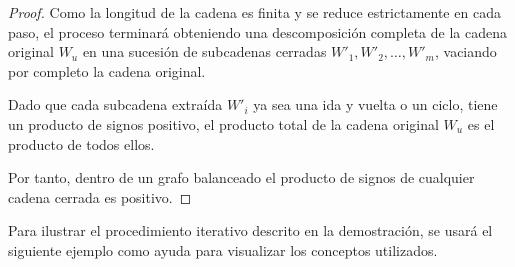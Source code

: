 \documentclass[11pt,a4paper,spanish]{report}
\theoremstyle{plain}
\begin{document}
\begin{proof}

Como la longitud de la cadena es finita y se reduce estrictamente en cada paso, el proceso terminará obteniendo una descomposición completa de la cadena original $W_u$ en una sucesión de subcadenas cerradas $W'_1, W'_2, \ldots, W'_m$, vaciando por completo la cadena original.

Dado que cada subcadena extraída $W'_i$ ya sea una ida y vuelta o un ciclo, tiene un producto de signos positivo, el producto total de la cadena original $W_u$ es el producto de todos ellos.

Por tanto, dentro de un grafo balanceado el producto de signos de cualquier cadena cerrada es positivo.
\end{proof}
Para ilustrar el procedimiento iterativo descrito en la demostración, se usará el siguiente ejemplo como ayuda para visualizar los conceptos utilizados.
\end{document}
